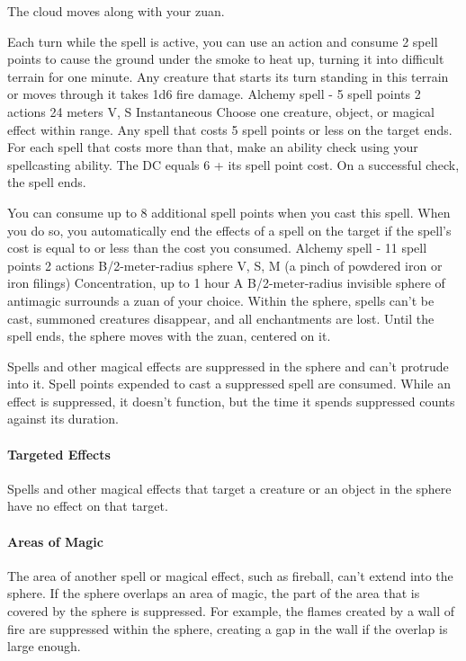         The cloud moves along with your zuan.

        Each turn while the spell is active, you can use an action and consume 2 spell points to cause the ground under the smoke to heat up, turning it into difficult terrain for one minute.
        Any creature that starts its turn standing in this terrain or moves through it takes 1d6 fire damage.
        {Alchemy spell - 5 spell points}
        {2 actions}
        {24 meters}
        {V, S}
        {Instantaneous}
        Choose one creature, object, or magical effect within range.
        Any spell that costs 5 spell points or less on the target ends.
        For each spell that costs more than that, make an ability check using your spellcasting ability.
        The DC equals 6 + its spell point cost.
        On a successful check, the spell ends.

        You can consume up to 8 additional spell points when you cast this spell.
        When you do so, you automatically end the effects of a spell on the target if the spell's cost is equal to or less than the cost you consumed.
        {Alchemy spell - 11 spell points}
        {2 actions}
        {B/2-meter-radius sphere}
        {V, S, M (a pinch of powdered iron or iron filings)}
        {Concentration, up to 1 hour}
        A B/2-meter-radius invisible sphere of antimagic surrounds a zuan of your choice.
        Within the sphere, spells can't be cast, summoned creatures disappear, and all enchantments are lost.
        Until the spell ends, the sphere moves with the zuan, centered on it.

        Spells and other magical effects are suppressed in the sphere and can't protrude into it.
        Spell points expended to cast a suppressed spell are consumed.
        While an effect is suppressed, it doesn't function, but the time it spends suppressed counts against its duration.

        \paragraph{Targeted Effects}
        Spells and other magical effects that target a creature or an object in the sphere have no effect on that target.

        \paragraph{Areas of Magic}
        The area of another spell or magical effect, such as fireball, can't extend into the sphere.
        If the sphere overlaps an area of magic, the part of the area that is covered by the sphere is suppressed.
        For example, the flames created by a wall of fire are suppressed within the sphere, creating a gap in the wall if the overlap is large enough.

